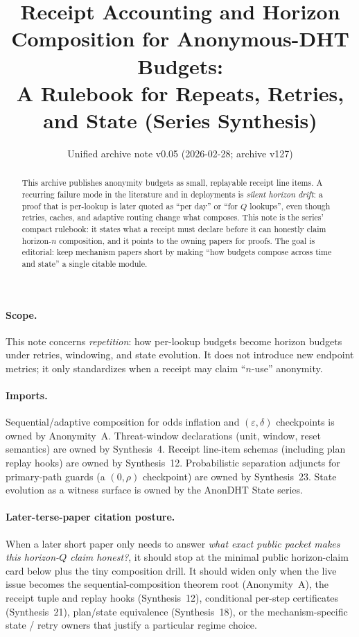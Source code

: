 \documentclass[11pt]{article}
\title{Receipt Accounting and Horizon Composition for Anonymous-DHT Budgets:\\
\large A Rulebook for Repeats, Retries, and State (Series Synthesis)}
\author{}
\date{Unified archive note v0.05 (2026-02-28; archive v127)}
\newcommand{\eps}{\varepsilon}
\begin{document}
\maketitle

\begin{abstract}
This archive publishes anonymity budgets as small, replayable receipt line items.
A recurring failure mode in the literature and in deployments is \emph{silent horizon drift}: a proof that is per-lookup is later quoted as ``per day'' or ``for $Q$ lookups'', even though retries, caches, and adaptive routing change what composes.
This note is the series' compact rulebook: it states what a receipt must declare before it can honestly claim horizon-$n$ composition, and it points to the owning papers for proofs.
The goal is editorial: keep mechanism papers short by making ``how budgets compose across time and state'' a single citable module.
\end{abstract}

\paragraph{Scope.}
This note concerns \emph{repetition}: how per-lookup budgets become horizon budgets under retries, windowing, and state evolution.
It does not introduce new endpoint metrics; it only standardizes when a receipt may claim ``$n$-use'' anonymity.

\paragraph{Imports.}
Sequential/adaptive composition for odds inflation and $(\eps,\delta)$ checkpoints is owned by Anonymity~A.\cite{series:oddsinflation}
Threat-window declarations (unit, window, reset semantics) are owned by Synthesis~4.\cite{series:threatwindows}
Receipt line-item schemas (including plan replay hooks) are owned by Synthesis~12.\cite{series:receiptitems}
Probabilistic separation adjuncts for primary-path guards (a $(0,\rho)$ checkpoint) are owned by Synthesis~23.\cite{series:probsep}
State evolution as a witness surface is owned by the AnonDHT State series.\cite{series:state1}

\paragraph{Later-terse-paper citation posture.}
When a later short paper only needs to answer \emph{what exact public packet makes this horizon-$Q$ claim honest?}, it should stop at the minimal public horizon-claim card below plus the tiny composition drill.
It should widen only when the live issue becomes the sequential-composition theorem root (Anonymity~A), the receipt tuple and replay hooks (Synthesis~12), conditional per-step certificates (Synthesis~21), plan/state equivalence (Synthesis~18), or the mechanism-specific state / retry owners that justify a particular regime choice.\cite{series:oddsinflation,series:receiptitems,series:condcert,series:planstateequiv,series:operationalA,series:operationalB,series:state1}
\end{document}
